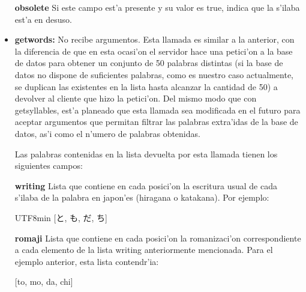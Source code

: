 \begin{itemize}
\textbf{obsolete} Si este campo est'a presente y su valor es true, indica que la s'ilaba est'a en desuso.
\item \textbf{getwords:} No recibe argumentos. Esta llamada es similar a la anterior, con la diferencia de que en
esta ocasi'on el servidor hace una petici'on a la base de datos para obtener un conjunto de 50 palabras distintas (si
la base de datos no dispone de suficientes palabras, como es nuestro caso actualmente, se duplican las existentes en
la lista hasta alcanzar la cantidad de 50) a devolver al cliente que hizo la petici'on.
Del mismo modo que con getsyllables, est'a planeado que esta llamada sea modificada en el futuro para aceptar
argumentos que permitan filtrar las palabras extra'idas de la base de datos, as'i como el n'umero de palabras
obtenidas.

Las palabras contenidas en la lista devuelta por esta llamada tienen los siguientes campos:

\textbf{writing} Lista que contiene en cada posici'on la escritura usual de cada s'ilaba de la palabra en japon'es 
(hiragana o katakana). Por ejemplo:

\begin{center}
\begin{CJK}{UTF8}{min}
[と, も, だ, ち]
\end{CJK}
\end{center}

\textbf{romaji} Lista que contiene en cada posici'on la romanizaci'on correspondiente a cada elemento de la lista
writing anteriormente mencionada. Para el ejemplo anterior, esta lista contendr'ia:

\begin{center}
[to, mo, da, chi]
\end{center}
\end{itemize}
